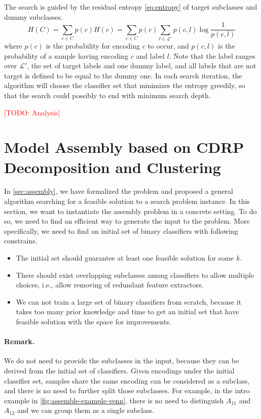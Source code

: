 \documentclass[sigplan,10pt,review]{acmart}\settopmatter{printfolios=true,printccs=false,printacmref=false}
\newcommand{\todo}[1]{\textcolor{red}{[TODO: #1]}}
\begin{document}
The search is guided by the residual entropy \eqref{eq:entropy} of target subclasses and dummy subclasses.
\begin{equation}
	H(C) = \sum_{c \in C} p(c)H(c) = \sum_{c \in C} p(c)\sum_{l \in \mathcal{L}'} p(c, l)\log\frac{1}{p(c, l)}
	\label{eq:entropy}
\end{equation}
where $p(c)$ is the probability for encoding $c$ to occur, and $p(c, l)$ is the probability of a sample having encoding $c$ and label $l$.
Note that the label ranges over $\mathcal{L}'$, the set of target labels and one dummy label, and all labels that are not target is defined to be equal to the dummy one.
In each search iteration, the algorithm will choose the classifier set that minimizes the entropy greedily, so that the search could possibly to end with minimum search depth.

\todo{Analysis}

\section{Model Assembly based on CDRP Decomposition and Clustering}
\label{sec:cdrp}
In \cref{sec:assembly}, we have formalized the problem and proposed a general algorithm searching for a feasible solution to a search problem instance.
In this section, we want to instantiate the assembly problem in a concrete setting.
To do so, we need to find an efficient way to generate the input to the problem.
More specifically, we need to find an initial set of binary classifiers with following constrains.
\begin{itemize}
	\item The initial set should guarantee at least one feasible solution for some $k$.
	\item There should exist overlapping subclasses among classifiers to allow multiple choices, i.e., allow removing of redundant feature extractors.
	\item We can not train a large set of binary classifiers from scratch, because it takes too many prior knowledge and time to get an initial set that have feasible solution with the space for improvements.
\end{itemize}



\paragraph{Remark.} We do not need to provide the subclasses in the input, because they can be derived from the initial set of classifiers.
Given encodings under the initial classifier set, samples share the same encoding can be considered as a subclass, and there is no need to further split those subclasses.
For example, in the intro example in \cref{fig:assemble-example-venn}, there is no need to distinguish $A_{11}$ and $A_{12}$ and we can group them as a single subclass.
\end{document}
